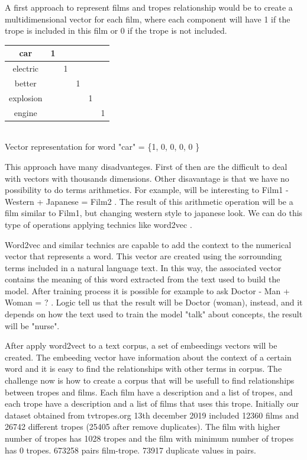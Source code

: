 \documentclass[letterpaper]{article}
\begin{document}
A first approach to represent films and tropes relationship would be to create a multidimensional vector for each film, where each component will have 1 if the trope is included in this film or 0 if the trope is not included. 
\begin{center}
	
\begin{tabular}{|c|c|c|c|c|c|} 
	\hline car 
	& 1 &  &  &  & \\ 
	\hline electric
	&  & 1 &  &  & \\ 
	\hline better
	&  &  & 1 &  & \\ 
	\hline explosion
	&  &  &  & 1 & \\ 
	\hline engine
	&  &  &  &  & 1 \\ 
	\hline 
\end{tabular} 
   \\ Vector representation for word "car" = \{1, 0, 0, 0, 0 \}    
\end{center}

This approach have many disadvanteges. First of then are the difficult to deal with vectors with thousands dimensions. Other disavantage is that we have no possibility to do terms arithmetics. For example, will be interesting to Film1 - Western + Japanese = Film2 . The result of this arithmetic operation will be a film similar to Film1, but changing western style to japanese look. We can do this type of operations applying technics like word2vec \cite{mikolov2013}.  

Word2vec and similar technics are capable to add the context to the numerical vector that represents a word. This vector are created using the sorrounding terms included in a natural language text. In this way, the associated vector contains the meaning of this word extracted from the text used to build the model. After training process it is possible for example to ask Doctor - Man + Woman = ? . Logic tell us that the result will be Doctor (woman), instead, and it depends on how the text used to train the model "talk" about concepts, the result will be "nurse".  
   
After apply word2vect to a text corpus, a set of embeedings vectors will be created. The embeeding vector have information about the context of a certain word and it is easy to find the relationships with other terms in corpus. The challenge now is how to create a corpus that will be usefull to find relationships between tropes and films. Each film have a description and a list of tropes, and each trope have a description and a list of films that uses this trope. Initially our dataset obtained from tvtropes.org 13th december 2019 included 12360 films and 26742 different tropes (25405 after remove duplicates). The film with higher number of tropes has 1028 tropes and the film with minimum number of tropes has 0 tropes. 673258 pairs film-trope. 73917 duplicate values in pairs. 
\end{document}
